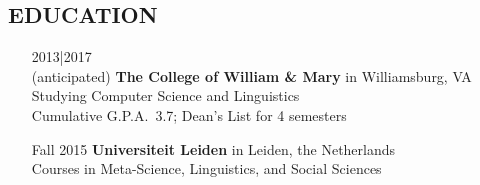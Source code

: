 \documentclass{res}     %
\begin{document}
\begin{resume}

\section{EDUCATION}
\vspace{5mm}
\begin{itemize}[font=\itshape,align=parleft,labelwidth=3cm,leftmargin=2cm]
    \item[2013|2017\\(anticipated)]
        \textbf{The College of William \& Mary} in Williamsburg, VA
        \\ Studying
        Computer Science and Linguistics %
        \\ Cumulative G.P.A.\ 3.7; Dean's List for 4 semesters
    \item[Fall 2015]
        \textbf{Universiteit Leiden} in Leiden, the Netherlands
        \\ Courses in
        Meta-Science, Linguistics, and Social Sciences %
\end{itemize}


\end{resume}
\end{document}
